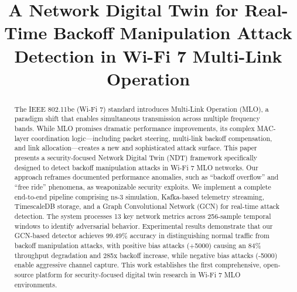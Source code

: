 \documentclass[conference]{IEEEtran}
\begin{document}
\title{A Network Digital Twin for Real-Time Backoff Manipulation Attack Detection in Wi-Fi 7 Multi-Link Operation}

\author{
    \and
}

\maketitle

\begin{abstract}
The IEEE 802.11be (Wi-Fi 7) standard introduces Multi-Link Operation (MLO), a paradigm shift that enables simultaneous transmission across multiple frequency bands. While MLO promises dramatic performance improvements, its complex MAC-layer coordination logic---including packet steering, multi-link backoff compensation, and link allocation---creates a new and sophisticated attack surface. This paper presents a security-focused Network Digital Twin (NDT) framework specifically designed to detect backoff manipulation attacks in Wi-Fi 7 MLO networks. Our approach reframes documented performance anomalies, such as ``backoff overflow'' and ``free ride'' phenomena, as weaponizable security exploits. We implement a complete end-to-end pipeline comprising ns-3 simulation, Kafka-based telemetry streaming, TimescaleDB storage, and a Graph Convolutional Network (GCN) for real-time attack detection. The system processes 13 key network metrics across 256-sample temporal windows to identify adversarial behavior. Experimental results demonstrate that our GCN-based detector achieves 99.49\% accuracy in distinguishing normal traffic from backoff manipulation attacks, with positive bias attacks (+5000) causing an 84\% throughput degradation and 285x backoff increase, while negative bias attacks (-5000) enable aggressive channel capture. This work establishes the first comprehensive, open-source platform for security-focused digital twin research in Wi-Fi 7 MLO environments.
\end{abstract}
\end{document}
